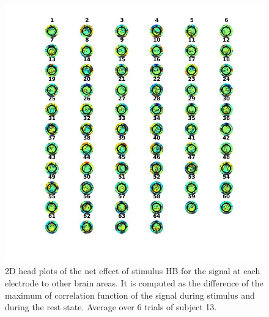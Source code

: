 \documentclass[a4paper]{article}
\begin{document}
\begin{figure}[H]
    \centering
    \includegraphics[width=16cm]{HB1.jpg}
    \caption{2D head plots of the net effect of stimulus HB for the signal at each electrode to other brain areas. It is computed as the difference of the maximum of correlation function of the signal during stimulus and during the rest state. Average over 6 trials of subject 13.}
    \label{fig:hb1}
\end{figure}
\end{document}
